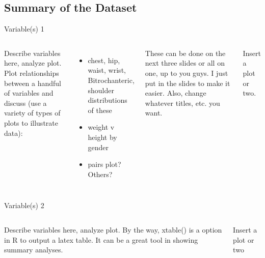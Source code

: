 \documentclass{beamer}\usepackage[]{graphicx}\usepackage[]{color}
\begin{document}

\subsection{Summary of the Dataset}


\begin{frame}{Variable(s) 1}
\begin{columns}[c] %

Describe variables here, analyze plot.\\

Plot relationships between a handful of variables and discuss (use a variety of types of plots to illustrate data):\\
\begin{itemize}
  \item  chest, hip, waist, wrist, Bitrochanteric, shoulder  distributions of these
  \item  weight v height by gender
  \item  pairs plot? Others?
\end{itemize}
These can be done on the next three slides or all on one, up to you guys. I just put in the slides to make it easier. Also, change whatever titles, etc. you want.

Insert a plot or two.



\end{columns}
\end{frame}


\begin{frame}{Variable(s) 2}
\begin{columns}[c] 

Describe variables here, analyze plot. By the way, xtable() is a option in R to output a latex table. It can be a great tool in showing summary analyses.

Insert a plot or two



\end{columns}
\end{frame}
\end{document}
